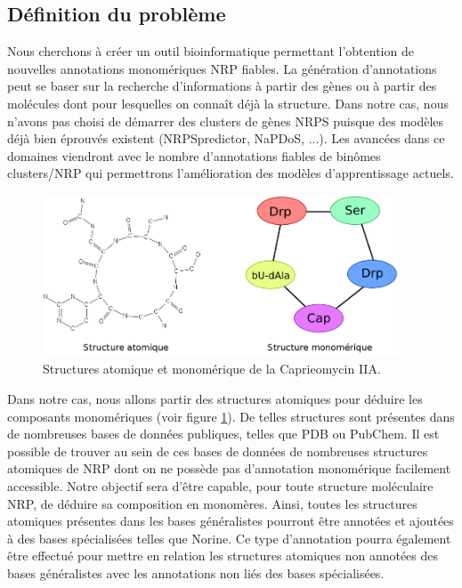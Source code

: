 \subsection{Définition du problème}

Nous cherchons à créer un outil bioinformatique permettant l'obtention de nouvelles annotations monomériques NRP fiables.
La génération d'annotations peut se baser sur la recherche d'informations à partir des gènes ou à partir des molécules dont pour lesquelles on connaît déjà la structure.
Dans notre cas, nous n'avons pas choisi de démarrer des clusters de gènes NRPS puisque des modèles déjà bien éprouvés existent (NRPSpredictor, NaPDoS, ...).
Les avancées dans ce domaines viendront avec le nombre d'annotations fiables de binômes clusters/NRP qui permettrons l'amélioration des modèles d'apprentissage actuels.

\begin{figure}[!ht]
  \begin{center}
    \includegraphics[width=400px]{Figures/s2m/Intro/structures.png}
    \caption{\label{structures}Structures atomique et monomérique de la Caprieomycin IIA.}
  \end{center}
\end{figure}

Dans notre cas, nous allons partir des structures atomiques pour déduire les composants monomériques (voir figure \ref{structures}).
De telles structures sont présentes dans de nombreuses bases de données publiques, telles que PDB ou PubChem.
Il est possible de trouver au sein de ces bases de données de nombreuses structures atomiques de NRP dont on ne possède pas d'annotation monomérique facilement accessible.
Notre objectif sera d'être capable, pour toute structure moléculaire NRP, de déduire sa composition en monomères.
Ainsi, toutes les structures atomiques présentes dans les bases généralistes pourront être annotées et ajoutées à des bases spécialisées telles que Norine.
Ce type d'annotation pourra également être effectué pour mettre en relation les structures atomiques non annotées des bases généralistes avec les annotations non liés des bases spécialisées.



